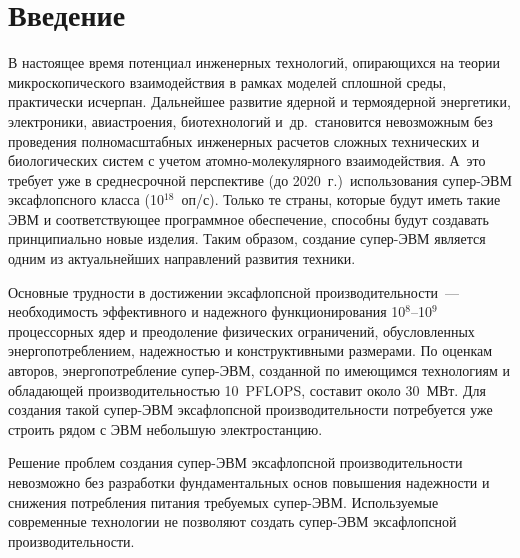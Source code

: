 


      \thispagestyle{headings}

      \begin{multicols}{2}

            \label{st\stat}     

\section{Введение}

       В настоящее время потенциал инженерных технологий, опирающихся на теории 
микроскопического взаимодействия в рамках моделей сплошной среды, практически 
исчерпан. Дальнейшее развитие ядерной и термоядерной энергетики, электроники, 
авиастроения, биотехнологий и~др.\ становится невозможным без проведения 
полномасштабных инженерных расчетов сложных технических и биологических систем с 
учетом атом\-но-мо\-ле\-ку\-ляр\-но\-го взаимодействия. А~это требует уже в среднесрочной 
перспективе (до 2020~г.)\ использования су\-пер-ЭВМ эксафлопсного класса (10$^{18}$~оп/с). 
Только те страны, которые будут иметь такие ЭВМ и соответствующее программное 
обеспечение, способны будут создавать принципиально новые изделия. Таким образом, 
создание супер-ЭВМ является одним из актуальнейших направлений развития техники.
       
       Основные трудности в достижении эксафлопсной производительности~--- 
необходимость эффективного и надежного функционирования 10$^8$--10$^9$ процессорных ядер и 
преодоление физических ограничений, обусловленных энергопотреблением, надежностью и 
конструктивными размерами. По оценкам авторов, энергопотребление су\-пер-ЭВМ, 
созданной по имеющимся технологиям и обладающей производительностью 10~PFLOPS, 
составит около 30~МВт. Для создания такой су\-пер-ЭВМ эксафлопсной 
производительности потребуется уже строить рядом с ЭВМ небольшую электростанцию. 

Решение проблем создания су\-пер-ЭВМ эксафлопсной производительности невозможно без 
разработки фундаментальных основ повышения на\-деж\-ности и снижения потребления 
питания требуемых су\-пер-ЭВМ. Используемые современные технологии не позволяют 
создать су\-пер-ЭВМ экса\-флоп\-сной производительности. 


\end{multicols}
